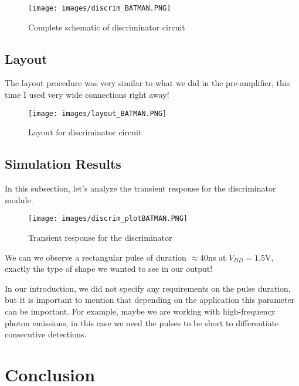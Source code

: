\documentclass[a4paper,12pt,twoside]{article}
\begin{document}
	\begin{figure}[h!]
		\centering
		\texttt{[image: images/discrim\_BATMAN.PNG]}
		\label{BATMAN}
		\caption{Complete schematic of discriminator circuit}
	\end{figure} 
	
	\subsection{Layout}
	
	The layout procedure was very similar to what we did in the pre-amplifier, this time I used very wide connections right away!
	
	\begin{figure}[h!]
		\centering
		\texttt{[image: images/layout\_BATMAN.PNG]}
		\label{layoutBATMAN}
		\caption{Layout for discriminator circuit}
	\end{figure}
	
	\newpage
	
	\subsection{Simulation Results}
	
	In this subsection, let's analyze the transient response for the discriminator module.
	
	\begin{figure}[h!]
		\centering
		\texttt{[image: images/discrim\_plotBATMAN.PNG]}
		\label{plotBATMAN}
		\caption{Transient response for the discriminator}
	\end{figure}
	
	We can we observe a rectangular pulse of duration $\approx 40$ns at $V_{DD} = 1.5$V, exactly the type of shape we wanted to see in our output!
	
	In our introduction, we did not specify any requirements on the pulse duration, but it is important to mention that depending on the application this parameter can be important. For example, maybe we are working with high-frequency photon emissions, in this case we need the pulses to be short to differentiate consecutive detections.
	
	\newpage
	
	\section{Conclusion}
	
\end{document}
